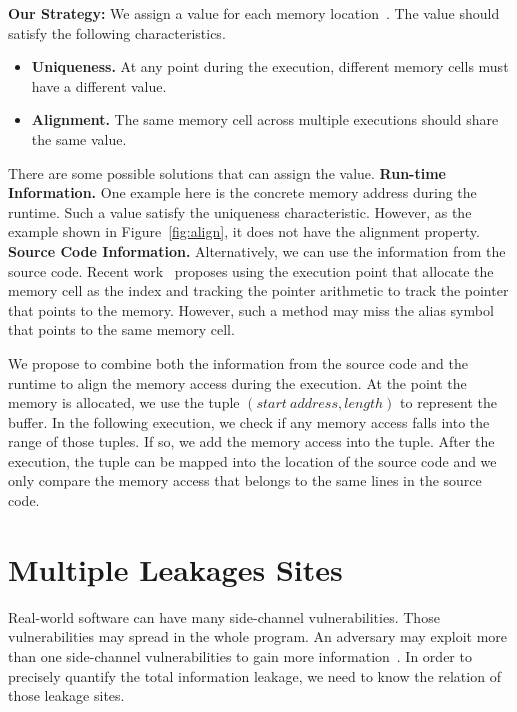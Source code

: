 \textbf{Our Strategy: } We assign a value for each memory location~\cite{sumner2010memory}. The value should satisfy the following characteristics.
\begin{itemize}
  \item \textbf{Uniqueness.} At any point during the execution, different memory cells must have a different value.
  \item \textbf{Alignment.} The same memory cell across multiple executions should share the same value.
\end{itemize}

There are some possible solutions that can assign the value.
\textbf{Run-time Information.} One example here is the concrete memory address during the runtime. Such a value satisfy the uniqueness characteristic. However, as the example shown in Figure~\ref{fig:align}, it does not have the alignment property.
\textbf{Source Code Information.} Alternatively, we can use the information from the source code. Recent work~\cite{sumner2010memory} proposes using the execution point that allocate the memory cell as the index and tracking the pointer arithmetic to track the pointer that points to the memory. However, such a method may miss the alias symbol that points to the same memory cell.

We propose to combine both the information from the source code and the runtime to align the memory access during the execution. At the point the memory is allocated, we use the tuple $(start\ address, length)$ to represent the buffer. In the following execution, we check if any memory access falls into the range of those tuples. If so, we add the memory access into the tuple. After the execution, the tuple can be mapped into the location of the source code and we only compare the memory access that belongs to the same lines in the source code.

\section{Multiple Leakages Sites}
Real-world software can have many side-channel vulnerabilities. Those vulnerabilities may spread in the whole program. An adversary may exploit more than one side-channel vulnerabilities to gain more information~\cite{7163052, 191010}. In order to precisely quantify the
total information leakage, we need to know the relation of those leakage sites. 


